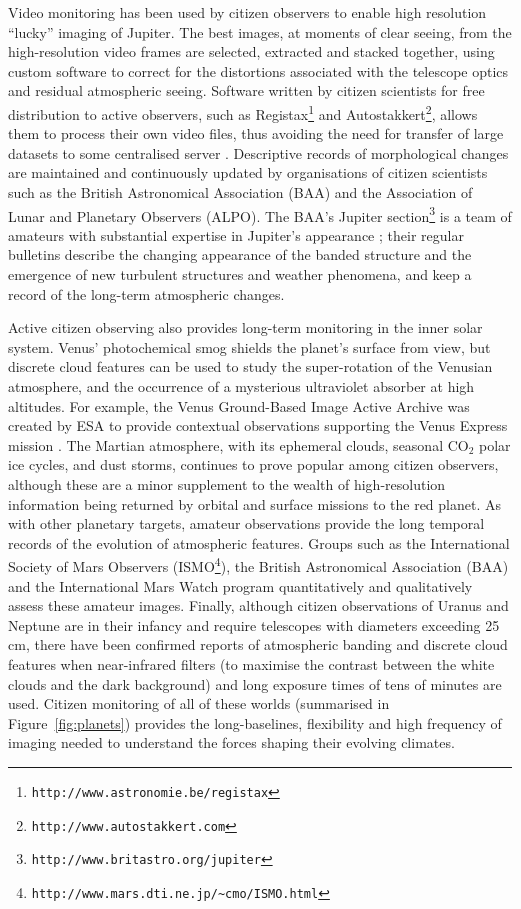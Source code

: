 \documentclass{ar2e}
\def\Fref#1{Figure~\ref{#1}\xspace}
\def\url#1{\texttt{#1}}
\begin{document}
Video monitoring has been used by citizen observers to enable high resolution
``lucky'' imaging of Jupiter. The best images, at moments of clear seeing, from
the high-resolution video frames are selected, extracted and stacked together,
using custom software to correct for the distortions associated with the
telescope optics and residual atmospheric seeing.  Software written by citizen
scientists for free distribution to active observers, such as
Registax\footnote{\url{http://www.astronomie.be/registax}} and
Autostakkert\footnote{\url{http://www.autostakkert.com}},  allows them to process their own
video files, thus avoiding the need for transfer of large datasets to some
centralised server \citep[see][for a thorough review]{14mousis_proam}. 
Descriptive records of morphological changes are maintained and continuously
updated by organisations of citizen scientists such as the British Astronomical
Association (BAA) and the Association of Lunar and Planetary Observers (ALPO).
The BAA's Jupiter section\footnote{\url{http://www.britastro.org/jupiter}} is a
team of amateurs with substantial expertise in Jupiter's appearance
\citep{95rogers};  their regular bulletins describe the changing appearance of
the banded structure and the emergence of new turbulent structures and weather
phenomena, and keep a record of the long-term atmospheric changes.  

Active citizen observing also provides long-term monitoring in the inner solar
system.  Venus' photochemical smog shields the planet's surface from view, but
discrete cloud features can be used to study the super-rotation of the Venusian
atmosphere, and the occurrence of a mysterious ultraviolet absorber at high
altitudes.  For example, the Venus Ground-Based Image Active Archive was created
by ESA to provide contextual observations supporting the Venus Express mission
\citep{08barentsen}.  The Martian atmosphere, with its ephemeral clouds,
seasonal CO$_2$ polar ice cycles, and dust storms, continues to prove popular
among citizen observers, although these are a minor supplement to the wealth of
high-resolution information being returned by orbital and surface missions to
the red planet.  As with other planetary targets, amateur observations provide
the long temporal records of the evolution of atmospheric features.  Groups such
as the International Society of Mars Observers
(ISMO\footnote{\url{http://www.mars.dti.ne.jp/\textasciitilde cmo/ISMO.html}}), the British
Astronomical Association (BAA) and the International Mars Watch program
quantitatively and qualitatively assess these amateur images.  Finally, although
citizen observations of Uranus and Neptune are in their infancy and require
telescopes with diameters exceeding 25 cm, there have been confirmed reports of
atmospheric banding and discrete cloud features when near-infrared filters  (to
maximise the contrast between the white clouds and the dark background) and long
exposure times of tens of minutes are used.  Citizen monitoring of all of these
worlds (summarised in \Fref{fig:planets}) provides the long-baselines,
flexibility and high frequency of imaging needed to understand the forces
shaping their evolving climates.
\end{document}
